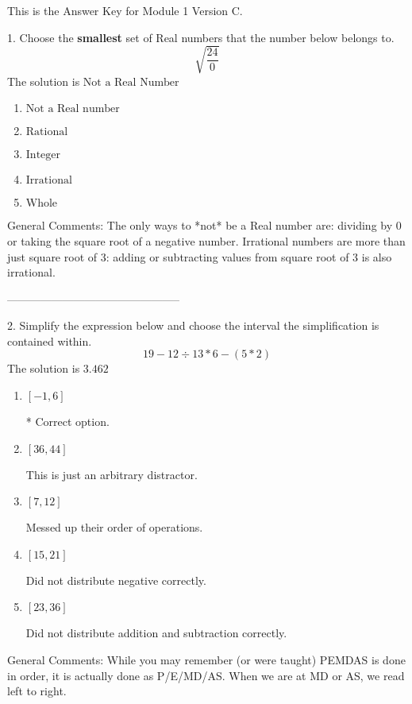 \documentclass{article}[10pt]
\begin{document}
This is the Answer Key for Module 1 Version C.

1. Choose the \textbf{smallest} set of Real numbers that the number below belongs to.
$$ \sqrt{\frac{24}{0}} $$ 
The solution is $ \text{Not a Real Number} $ 

\begin{enumerate}[label=\Alph*.] 
\item $ \text{Not a Real number} $ 

  
\item $ \text{Rational} $ 

  
\item $ \text{Integer} $ 

  
\item $ \text{Irrational} $ 

  
\item $ \text{Whole} $ 

  
\end{enumerate} 
 
General Comments: The only ways to *not* be a Real number are: dividing by 0 or taking the square root of a negative number. Irrational numbers are more than just square root of 3: adding or subtracting values from square root of 3 is also irrational.

-----------------------------------------------

2. Simplify the expression below and choose the interval the simplification is contained within.
$$ 19 - 12 \div 13 * 6 - (5 * 2) $$ 
The solution is $ 3.462 $ 

\begin{enumerate}[label=\Alph*.] 
\item $ [-1, 6] $ 

 * Correct option. 
\item $ [36, 44] $ 

  This is just an arbitrary distractor. 
\item $ [7, 12] $ 

  Messed up their order of operations. 
\item $ [15, 21] $ 

  Did not distribute negative correctly. 
\item $ [23, 36] $ 

  Did not distribute addition and subtraction correctly. 
\end{enumerate} 
 
General Comments: While you may remember (or were taught) PEMDAS is done in order, it is actually done as P/E/MD/AS. When we are at MD or AS, we read left to right.
\end{document}

